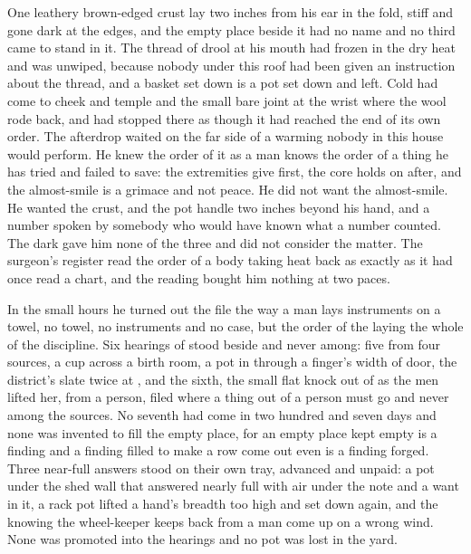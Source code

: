 One leathery brown-edged crust lay two inches from his ear in the fold, stiff and gone dark at the edges, and the empty place beside it had no name and no third came to stand in it. The thread of drool at his mouth had frozen in the dry heat and was unwiped, because nobody under this roof had been given an instruction about the thread, and a basket set down is a pot set down and left. Cold had come to cheek and temple and the small bare joint at the wrist where the wool rode back, and had stopped there as though it had reached the end of its own order. The afterdrop waited on the far side of a warming nobody in this house would perform. He knew the order of it as a man knows the order of a thing he has tried and failed to save: the extremities give first, the core holds on after, and the almost-smile is a grimace and not peace. He did not want the almost-smile. He wanted the crust, and the pot handle two inches beyond his hand, and a number spoken by somebody who would have known what a number counted. The dark gave him none of the three and did not consider the matter. The surgeon's register read the order of a body taking heat back as exactly as it had once read a chart, and the reading bought him nothing at two paces.

In the small hours he turned out the file the way a man lays instruments on a towel, no towel, no instruments and no case, but the order of the laying the whole of the discipline. Six hearings of  stood beside and never among: five from four sources, a cup across a birth room, a pot in  through a finger's width of door, the district's slate twice at , and the sixth, the small flat knock out of  as the men lifted her, from a person, filed where a thing out of a person must go and never among the sources. No seventh had come in two hundred and seven days and none was invented to fill the empty place, for an empty place kept empty is a finding and a finding filled to make a row come out even is a finding forged. Three near-full answers stood on their own tray, advanced and unpaid: a pot under the shed wall that answered nearly full with air under the note and a want in it, a rack pot lifted a hand's breadth too high and set down again, and the knowing the wheel-keeper keeps back from a man come up on a wrong wind. None was promoted into the hearings and no pot was lost in the yard.

